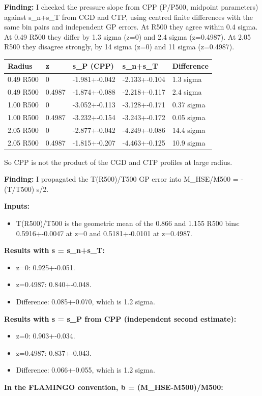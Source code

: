 \documentclass[11pt,a4paper]{article}
\begin{document}
\textbf{Finding:} I checked the pressure slope from CPP (P/P500, midpoint parameters) against s\_n+s\_T from CGD and CTP, using centred finite differences with the same bin pairs and independent GP errors. At R500 they agree within 0.4 sigma. At 0.49 R500 they differ by 1.3 sigma (z=0) and 2.4 sigma (z=0.4987). At 2.05 R500 they disagree strongly, by 14 sigma (z=0) and 11 sigma (z=0.4987).

\begin{longtable}{@{}p{}p{}p{}p{}p{}@{}}
\toprule
\textbf{Radius} & \textbf{z} & \textbf{s\_P (CPP)} & \textbf{s\_n+s\_T} & \textbf{Difference} \\ \midrule \endhead
0.49 R500 & 0 & -1.981+-0.042 & -2.133+-0.104 & 1.3 sigma \\
0.49 R500 & 0.4987 & -1.874+-0.088 & -2.218+-0.117 & 2.4 sigma \\
1.00 R500 & 0 & -3.052+-0.113 & -3.128+-0.171 & 0.37 sigma \\
1.00 R500 & 0.4987 & -3.232+-0.154 & -3.243+-0.172 & 0.05 sigma \\
2.05 R500 & 0 & -2.877+-0.042 & -4.249+-0.086 & 14.4 sigma \\
2.05 R500 & 0.4987 & -1.815+-0.207 & -4.463+-0.125 & 10.9 sigma \\
\bottomrule\end{longtable}
So CPP is not the product of the CGD and CTP profiles at large radius.

\textbf{Finding:} I propagated the T(R500)/T500 GP error into M\_HSE/M500 = -(T/T500) s/2.

\textbf{Inputs:}

\begin{itemize}
  \item T(R500)/T500 is the geometric mean of the 0.866 and 1.155 R500 bins: 0.5916+-0.0047 at z=0 and 0.5181+-0.0101 at z=0.4987.
\end{itemize}
\textbf{Results with s = s\_n+s\_T:}

\begin{itemize}
  \item z=0: 0.925+-0.051.
  \item z=0.4987: 0.840+-0.048.
  \item Difference: 0.085+-0.070, which is 1.2 sigma.
\end{itemize}
\textbf{Results with s = s\_P from CPP (independent second estimate):}

\begin{itemize}
  \item z=0: 0.903+-0.034.
  \item z=0.4987: 0.837+-0.043.
  \item Difference: 0.066+-0.055, which is 1.2 sigma.
\end{itemize}
\textbf{In the FLAMINGO convention, b = (M\_HSE-M500)/M500:}
\end{document}
